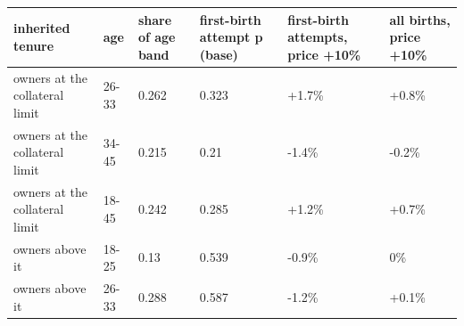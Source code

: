 \begingroup\small
\setlength{\tabcolsep}{3pt}
\renewcommand{\arraystretch}{1.04}
\begin{tabularx}{\linewidth}{XXXXXX}
\toprule
inherited tenure & age & share of age band & first-birth attempt p (base) & first-birth attempts, price +10\% & all births, price +10\% \\
\midrule
owners at the collateral limit & 26-33 & 0.262 & 0.323 & +1.7\% & +0.8\% \\
owners at the collateral limit & 34-45 & 0.215 & 0.21 & -1.4\% & -0.2\% \\
owners at the collateral limit & 18-45 & 0.242 & 0.285 & +1.2\% & +0.7\% \\
owners above it & 18-25 & 0.13 & 0.539 & -0.9\% & 0\% \\
owners above it & 26-33 & 0.288 & 0.587 & -1.2\% & +0.1\% \\
\bottomrule
\end{tabularx}
\endgroup
